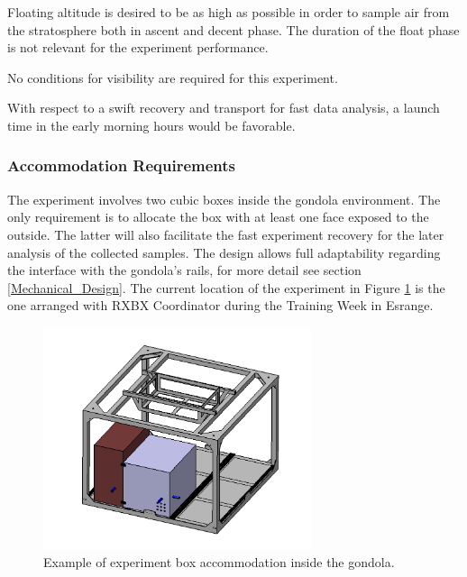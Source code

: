 Floating altitude is desired to be as high as possible in order to sample air from the stratosphere both in ascent and decent phase. The duration of the float phase is not relevant for the experiment performance. 

\smallskip
No conditions for visibility are required for this experiment.

\smallskip
With respect to a swift recovery and transport for fast data analysis, a launch time in the early morning hours would be favorable.

\pagebreak
\subsubsection{Accommodation Requirements}

The experiment involves two cubic boxes inside the gondola environment. The only requirement is to allocate the box with at least one face exposed to the outside. The latter will also facilitate the fast experiment recovery for the later analysis of the collected samples. The design allows full adaptability regarding the interface with the gondola's rails, for more detail see section \ref{Mechanical_Design}. The current location of the experiment in Figure \ref{goldola_accommodation} is the one arranged with RXBX Coordinator during the Training Week in Esrange.

\begin{figure}[!ht]
    \centering
    \includegraphics[width=0.7\textwidth]{6-launch-campaign-preparation/img/gondola_overview_sample.png}
    \caption{Example of experiment box accommodation inside the gondola.}
    \label{goldola_accommodation}
\end{figure}